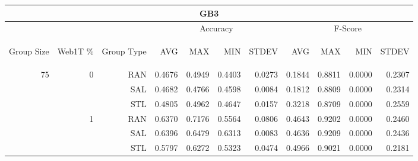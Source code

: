 \begin{center}
\begin{table}[htbp] 
 \begin{center}
\begin{tabular}{ | r | r | r | r | r | r | r | r | r | r | r |}
\hline
\multicolumn{11}{|c|}{GB3}\\
\hline
 & & & \multicolumn{4}{|c|}{Accuracy} & \multicolumn{4}{|c|}{F-Score}\\ \cline{4-11}
\begin{sideways}Group Size\end{sideways} & \begin{sideways}Web1T \%\end{sideways} & \begin{sideways}Group Type\end{sideways} & \begin{sideways}AVG\end{sideways} & \begin{sideways}MAX\end{sideways} & \begin{sideways}MIN\end{sideways} & \begin{sideways}STDEV\end{sideways} & \begin{sideways}AVG\end{sideways} & \begin{sideways}MAX\end{sideways} & \begin{sideways}MIN\end{sideways} & \begin{sideways}STDEV\end{sideways}\\
\hline
\multirow{18}{*}{75}
 & \multirow{3}{*}{0} & RAN & 0.4676 & 0.4949 & 0.4403 & 0.0273 & 0.1844 & 0.8811 & 0.0000 & 0.2307\\ \cline{3-11}
 &   & SAL & 0.4682 & 0.4766 & 0.4598 & 0.0084 & 0.1812 & 0.8809 & 0.0000 & 0.2314\\ \cline{3-11}
 &   & STL & 0.4805 & 0.4962 & 0.4647 & 0.0157 & 0.3218 & 0.8709 & 0.0000 & 0.2559\\ \cline{2-11}
 & \multirow{3}{*}{1} & RAN & 0.6370 & 0.7176 & 0.5564 & 0.0806 & 0.4643 & 0.9202 & 0.0000 & 0.2460\\ \cline{3-11}
 &   & SAL & 0.6396 & 0.6479 & 0.6313 & 0.0083 & 0.4636 & 0.9209 & 0.0000 & 0.2436\\ \cline{3-11}
 &   & STL & 0.5797 & 0.6272 & 0.5323 & 0.0474 & 0.4966 & 0.9021 & 0.0000 & 0.2181\\ \cline{2-11}

\end{tabular}
\end{center}
\end{table}
\end{center}
